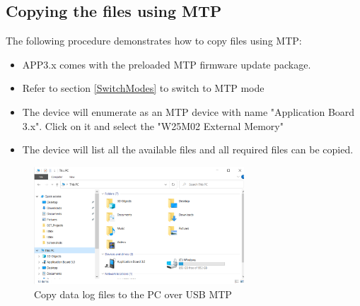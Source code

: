 \documentclass{article}
\begin{document}
\subsection{Copying the files using MTP}
The following procedure demonstrates how to copy files using MTP:
\begin{itemize}
	\item APP3.x comes with the preloaded MTP firmware update package.
	\item Refer to section \ref{SwitchModes} to switch to MTP mode
	\item The device will enumerate as an MTP device with name "Application Board 3.x". Click on it and select the "W25M02 External Memory"
	\item The device will list all the available files and all required files can be copied.
\end{itemize}

\begin{figure}[H]
	\begin{center}
		\includegraphics[width=0.7\textwidth]{coinesAPI_images/MTP_windows.png}
		\caption{Copy data log files to the PC over USB MTP}
	\end{center}
\end{figure}

\newpage
\end{document}
